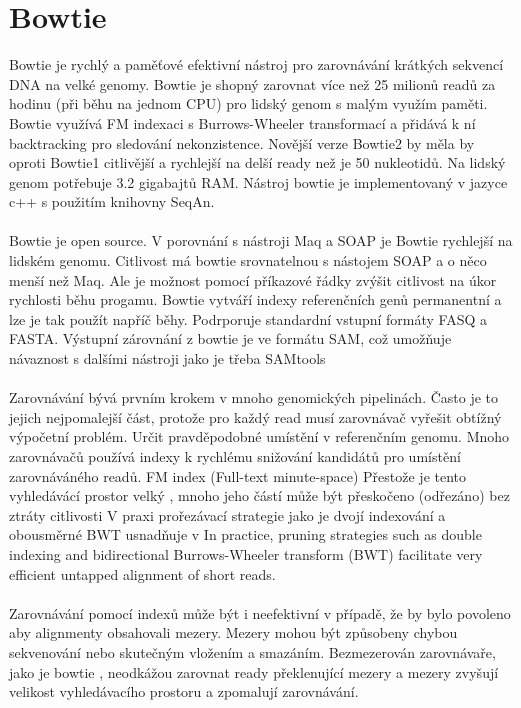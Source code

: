 \documentclass[czech,DP]{thesiskiv}
\numberwithin{equation}{section}
\begin{document}
\section{Bowtie}
Bowtie je rychlý a paměťové efektivní nástroj pro zarovnávání krátkých sekvencí DNA na velké genomy. Bowtie je shopný zarovnat více než 25 milionů readů za hodinu (při běhu na jednom CPU) pro lidský genom s malým využím paměti. Bowtie využívá FM indexaci s Burrows-Wheeler transformací a přidává k ní backtracking pro sledování nekonzistence. Novější verze Bowtie2 by měla by oproti Bowtie1 citlivější a rychlejší na delší ready než je 50 nukleotidů. Na lidský genom potřebuje 3.2 gigabajtů RAM. Nástroj bowtie je implementovaný v jazyce c++ s použitím knihovny SeqAn. \cite{bowtie} \cite{bowtie2} 
\\
\\
Bowtie je open source. V porovnání s nástroji Maq a SOAP je Bowtie rychlejší na lidském genomu. Citlivost má bowtie srovnatelnou s nástojem SOAP a o něco menší než Maq. Ale je možnost pomocí příkazové řádky zvýšit citlivost na úkor rychlosti běhu progamu. Bowtie vytváří indexy referenčních genů permanentní a lze je tak použít napříč běhy. Podrporuje standardní vstupní formáty FASQ a FASTA.  Výstupní zárovnání z bowtie je ve formátu SAM, což umožňuje návaznost s dalšími nástroji jako je třeba SAMtools
\\
\\
Zarovnávání bývá prvním krokem v mnoho genomických pipelinách. Často je to jejich nejpomalejší část, protože pro každý read musí zarovnávač vyřešit obtížný výpočetní problém. Určit pravděpodobné umístění v referenčním genomu. Mnoho zarovnávačů používá indexy k rychlému snižování kandidátů pro umístění zarovnáváného readů. FM index (Full-text minute-space) 
Přestože je tento vyhledávácí prostor velký , mnoho jeho částí může být přeskočeno (odřezáno) bez ztráty citlivosti
V praxi prořezávací strategie jako je dvojí indexování a obousměrné BWT usnadňuje v In practice, pruning strategies such as double indexing and bidirectional Burrows-Wheeler transform (BWT) facilitate very efficient untapped alignment of short reads.
\\
\\
Zarovnávání pomocí indexů může být i neefektivní v případě, že by bylo povoleno aby alignmenty obsahovali mezery. 
Mezery mohou být způsobeny chybou sekvenování nebo skutečným vložením a smazáním. 
Bezmezerován zarovnávaře, jako je bowtie , neodkážou zarovnat ready překlenující mezery a 
mezery zvyšují velikost vyhledávacího prostoru a zpomalují zarovnávání. 
\end{document}
